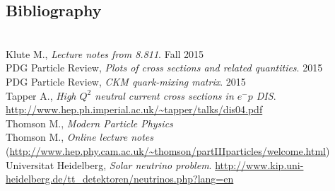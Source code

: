 \documentclass[11pt]{article}
\newcommand{\el}{\ensuremath{e^{-}}\xspace}
\newcommand{\bibspace}{\vspace{5mm}\\\noindent}
\begin{document}
\begin{appendices}
\section{Bibliography}
~
\bibspace Klute M., \emph{Lecture notes from 8.811}. Fall 2015
\bibspace PDG Particle Review, \emph{Plots of cross sections and related quantities}. 2015
\bibspace PDG Particle Review, \emph{CKM quark-mixing matrix}. 2015
\bibspace Tapper A., \emph{High $Q^2$ neutral current cross sections in $\el p$ DIS}. \url{http://www.hep.ph.imperial.ac.uk/~tapper/talks/dis04.pdf}
\bibspace Thomson M., \emph{Modern Particle Physics}
\bibspace Thomson M., \emph{Online lecture notes} (\url{http://www.hep.phy.cam.ac.uk/~thomson/partIIIparticles/welcome.html})
\bibspace Universitat Heidelberg, \emph{Solar neutrino problem}. \url{http://www.kip.uni-heidelberg.de/tt_detektoren/neutrinos.php?lang=en}

\end{appendices}
\end{document}
